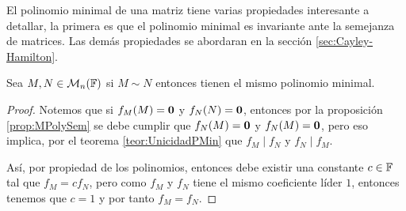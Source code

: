 El polinomio minimal de una matriz tiene varias propiedades interesante a detallar, la primera es que el polinomio minimal es invariante ante la semejanza de matrices. Las demás propiedades se abordaran en la sección \ref{sec:Cayley-Hamilton}.

\begin{prop}\label{prop:InvMinPoly}
  Sea $M,N \in \mathcal{M}_n(\mathbb{F})$ si $M \sim N$ entonces tienen el mismo polinomio minimal.
\end{prop}
\begin{proof}
  Notemos que si $f_M(M) = \mathbf{0}$ y $f_N(N) = \mathbf{0}$, entonces por la proposición \ref{prop:MPolySem} se debe cumplir que $f_N(M) = \mathbf{0}$ y $f_N(M) = \mathbf{0}$, pero eso implica, por el teorema \ref{teor:UnicidadPMin} que $f_M \mid f_N$ y $f_N \mid f_M$.

  Así, por propiedad de los polinomios, entonces debe existir una constante $c \in \mathbb{F}$ tal que $f_M = c f_N$, pero como $f_M$ y $f_N$ tiene el mismo coeficiente líder $1$, entonces tenemos que $c = 1$ y por tanto $f_M = f_N$.
\end{proof}

